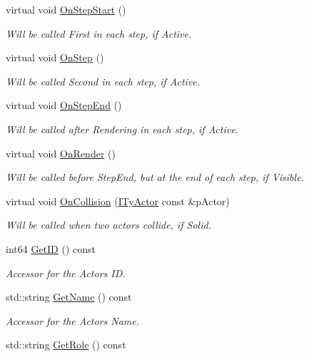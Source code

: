 \begin{DoxyCompactItemize}
virtual void \hyperlink{class_i_ty_actor_aeed7b53859c91f8be589ff441f36852d}{OnStepStart} ()
\begin{DoxyCompactList}\small\item\em Will be called First in each step, if Active. \end{DoxyCompactList}\item 
virtual void \hyperlink{class_i_ty_actor_a78ac709f1fdbd9fba59180337be44a7a}{OnStep} ()
\begin{DoxyCompactList}\small\item\em Will be called Second in each step, if Active. \end{DoxyCompactList}\item 
virtual void \hyperlink{class_i_ty_actor_aa539311a3f8cf47dd325f6cb6e7413a6}{OnStepEnd} ()
\begin{DoxyCompactList}\small\item\em Will be called after Rendering in each step, if Active. \end{DoxyCompactList}\item 
virtual void \hyperlink{class_i_ty_actor_ac5a0f1ef9aca4cf49893171c130abb9c}{OnRender} ()
\begin{DoxyCompactList}\small\item\em Will be called before StepEnd, but at the end of each step, if Visible. \end{DoxyCompactList}\item 
virtual void \hyperlink{class_i_ty_actor_a88b1d350c4649d2df9e358f15fbca9b2}{OnCollision} (\hyperlink{class_i_ty_actor}{ITyActor} const \&pActor)
\begin{DoxyCompactList}\small\item\em Will be called when two actors collide, if Solid. \end{DoxyCompactList}\item 
int64 \hyperlink{class_i_ty_actor_a56e1581ea21a61d56ee13065b1bb237d}{GetID} () const 
\begin{DoxyCompactList}\small\item\em Accessor for the Actors ID. \end{DoxyCompactList}\item 
std::string \hyperlink{class_i_ty_actor_ad96e4d0568d002ec80b3f3511d34bac4}{GetName} () const 
\begin{DoxyCompactList}\small\item\em Accessor for the Actors Name. \end{DoxyCompactList}\item 
std::string \hyperlink{class_i_ty_actor_acb6782b902f1d23196ee5d4459a7f4c6}{GetRole} () const 

\end{DoxyCompactItemize}
